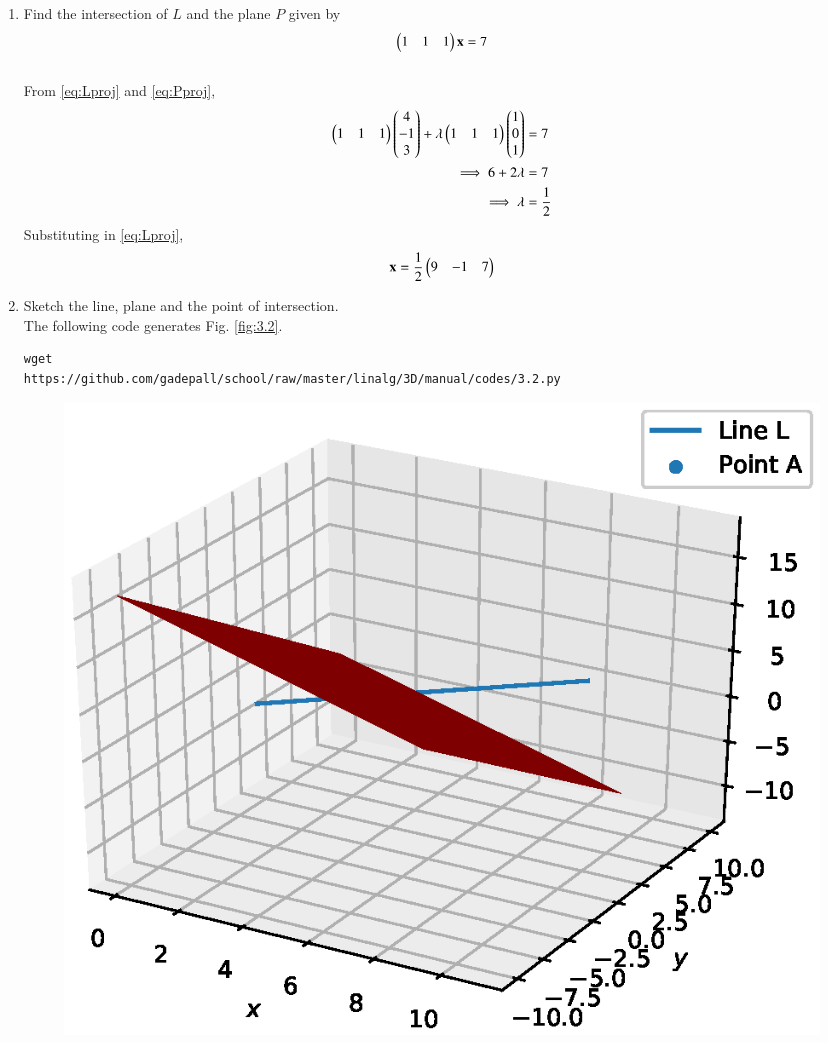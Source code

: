 \documentclass[journal,12pt,twocolumn]{IEEEtran}
\renewcommand\thesection{\arabic{section}}
\begin{document}
\begin{enumerate}[label=\thesection.\arabic*
,ref=\thesection.\theenumi]
\begin{figure}[!ht]
\caption{}
\label{fig:3.1}
\end{figure}
\item Find the intersection of $L$ and the plane $P$ given by
\begin{equation}
\begin{pmatrix}1 & 1 & 1\end{pmatrix}\mathbf{x} = 7
\label{eq:Pproj}
\end{equation}
\\
\solution From \eqref{eq:Lproj} and \eqref{eq:Pproj},
\begin{align}
 \begin{pmatrix}1 & 1 & 1\end{pmatrix}\begin{pmatrix}4 \\ -1 \\ 3\end{pmatrix} + \lambda \begin{pmatrix}1 & 1 & 1\end{pmatrix}
\begin{pmatrix}1 \\ 0 \\ 1\end{pmatrix} &= 7
\\
\implies 6 + 2\lambda &= 7
\\
\implies \lambda &= \frac{1}{2}
\end{align}
%
Substituting in \eqref{eq:Lproj},
\begin{equation}
\mathbf{x} = \frac{1}{2}\begin{pmatrix}9 & -1 & 7\end{pmatrix}
\end{equation}
\item Sketch the line, plane and the point of intersection.
\\
\solution The following code generates Fig. \ref{fig:3.2}.
\begin{lstlisting}
wget 
https://github.com/gadepall/school/raw/master/linalg/3D/manual/codes/3.2.py
\end{lstlisting}
\begin{figure}[!ht]
\centering
\includegraphics[width=\columnwidth]{./figs/3.2.eps}

\end{figure}
\end{enumerate}
\end{document}
